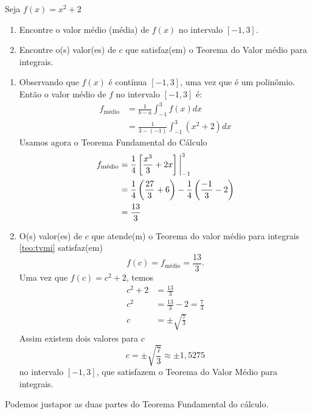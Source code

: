 \begin{example}
Seja $f(x)= x^2+2$
\begin{enumerate}[label=\alph*)]
  \item Encontre o valor médio (média) de $f(x)$ no intervalo $[-1, 3]$.
  \item Encontre o(s) valor(es) de $c$ que satisfaz(em)
        o Teorema do Valor médio para integrais.
\end{enumerate}
\solution
\begin{enumerate}[label=\alph*)]
  \item Observando que $f(x)$ é contínua $[-1, 3]$, uma vez que é um polinômio.
    Então o valor médio de $f$ no intervalo $[-1, 3]$ é:
    \begin{align*}
      f_{\textrm{médio}}
      & = \frac{1}{b-a}\int_{-1}^{3} f(x)dx \\
      & = \frac{1}{3-(-1)}\int_{-1}^{3} (x^2+2)dx
    \end{align*}
    Usamos agora o Teorema Fundamental do Cálculo
    \begin{align*}
      f_{\textrm{médio}}
      & = \frac{1}{4}\left[ \frac{x^3}{3}+2x\right] \bigg\rvert_{-1}^{3} \\
      & = \frac{1}{4}\left( \frac{27}{3}+6\right)
        - \frac{1}{4}\left( \frac{-1}{3}-2\right) \\
      & = \frac{13}{3}
    \end{align*}

  \item O(s) valor(es) de $c$ que atende(m) o Teorema do valor médio para
    integrais \ref{teo:tvmi} satisfaz(em)
    \[
      f(c) = f_{\textrm{médio}}= \frac{13}{3}.
    \]
    Uma vez que $f(c)= c^2+2$, temos
    \begin{align*}
      c^2+2 & = \frac{13}{3}                 \\
      c^2   & = \frac{13}{3}-2 = \frac{7}{3} \\
      c     & = \pm \sqrt{\frac{7}{3}}
    \end{align*}
    Assim existem dois valores para $c$
    \[
      c= \pm \sqrt{\frac{7}{3}} \approx \pm 1,5275
    \]
    no intervalo $[-1, 3]$, que satisfazem o Teorema do Valor Médio para integrais.
\end{enumerate}
\end{example}

Podemos justapor as duas partes do Teorema Fundamental do cálculo.

